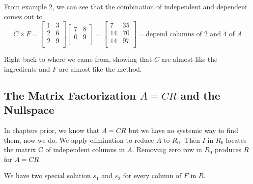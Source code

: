 From example 2, we can see that the combination of independent and dependent comes out to 
\[
    C \times F = 
    \begin{bmatrix}
        1 & 3  \\
        2 & 6  \\
        2 & 9  \\
    \end{bmatrix}
    \begin{bmatrix}
        7 & 8  \\
        0 & 9  \\
    \end{bmatrix}
    = 
    \begin{bmatrix}
        7 & 35  \\
        14 & 70  \\
        14 & 97  \\
    \end{bmatrix}
    =
    \text{depend columns of 2 and 4 of }A
\]

Right back to where we came from, showing that \(C\) are almost like the ingredients and \(F\) are almost like the method. 

\subsection{The Matrix Factorization \(A = CR\) and the Nullspace}

In chapters prior, we know that \(A = CR\) but we have no systemic way to find them, now we do. We apply elimination to reduce \(A \text{ to } R_0\). Then \(I\) in \(R_0\) locates the matrix C of independent columns in \(A\). Removing zero row in \(R_0\) produces \(R\) for \(A = CR\)

We have two special solution \(s_1\) and \(s_2\) for every column of \(F\) in \(R\).

